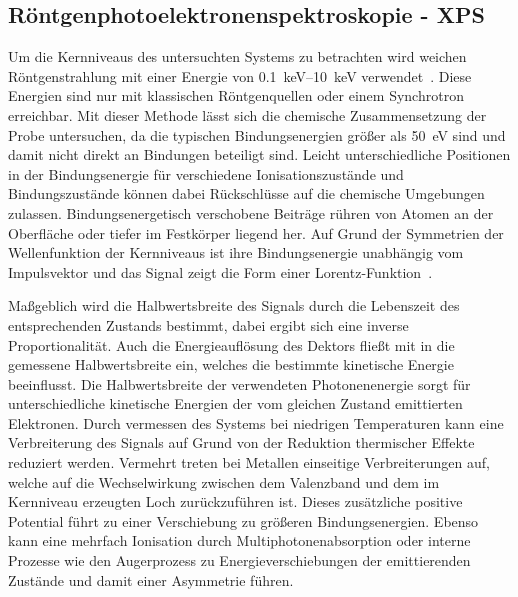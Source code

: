         \subsection{Röntgenphotoelektronenspektroskopie - XPS} \label{sec:XPS}
            Um die Kernniveaus des untersuchten Systems zu betrachten wird weichen Röntgenstrahlung mit einer Energie von \SIrange{0.1}{10}{\kilo\electronvolt} verwendet~\cite{Fauster}.
            Diese Energien sind nur mit klassischen Röntgenquellen oder einem Synchrotron erreichbar.
            Mit dieser Methode lässt sich die chemische Zusammensetzung der Probe untersuchen, da die typischen Bindungsenergien größer als \SI{50}{\electronvolt} sind und damit nicht direkt an Bindungen beteiligt sind.
            Leicht unterschiedliche Positionen in der Bindungsenergie für verschiedene Ionisationszustände und Bindungszustände können dabei Rückschlüsse auf die chemische Umgebungen zulassen.
            Bindungsenergetisch verschobene Beiträge rühren von Atomen an der Oberfläche oder tiefer im Festkörper liegend her.
            Auf Grund der Symmetrien der Wellenfunktion der Kernniveaus ist ihre Bindungsenergie unabhängig vom Impulsvektor und das Signal zeigt die Form einer Lorentz-Funktion~\cite{Hüfner}.

            Maßgeblich wird die Halbwertsbreite des Signals durch die Lebenszeit des entsprechenden Zustands bestimmt, dabei ergibt sich eine inverse Proportionalität.
            Auch die Energieauflösung des Dektors fließt mit in die gemessene Halbwertsbreite ein, welches die bestimmte kinetische Energie beeinflusst.
            Die Halbwertsbreite der verwendeten Photonenenergie sorgt für unterschiedliche kinetische Energien der vom gleichen Zustand emittierten Elektronen.
            Durch vermessen des Systems bei niedrigen Temperaturen kann eine Verbreiterung des Signals auf Grund von der Reduktion thermischer Effekte reduziert werden.
            Vermehrt treten bei Metallen einseitige Verbreiterungen auf, welche auf die Wechselwirkung zwischen dem Valenzband und dem im Kernniveau erzeugten Loch zurückzuführen ist.
            Dieses zusätzliche positive Potential führt zu einer Verschiebung zu größeren Bindungsenergien.
            Ebenso kann eine mehrfach Ionisation durch Multiphotonenabsorption oder interne Prozesse wie den Augerprozess zu Energieverschiebungen der emittierenden Zustände und damit einer Asymmetrie führen.

